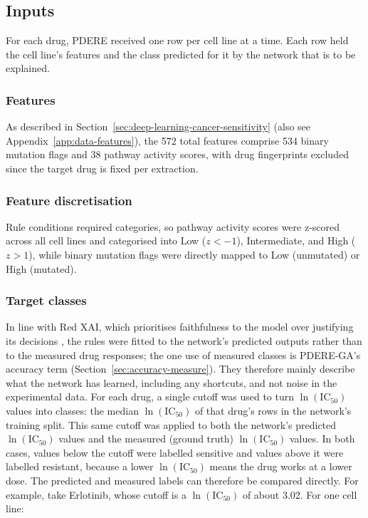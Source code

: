 \subsection{Inputs}
\label{sec:inputs}

For each drug, PDERE received one row per cell line at a time. Each row held the cell line's features and the class predicted for it by the network that is to be explained.

\subsubsection{Features}
\label{sec:features}

As described in Section~\ref{sec:deep-learning-cancer-sensitivity} (also see Appendix~\ref{app:data-features}), the 572 total features comprise 534 binary mutation flags and 38 pathway activity scores, with drug fingerprints excluded since the target drug is fixed per extraction.

\subsubsection{Feature discretisation}
\label{sec:discretisation}

Rule conditions required categories, so pathway activity scores were z-scored across all cell lines and categorised into Low ($z < -1$), Intermediate, and High ($z > 1$), while binary mutation flags were directly mapped to Low (unmutated) or High (mutated).

\subsubsection{Target classes}
\label{sec:target-classes}

In line with Red XAI, which prioritises faithfulness to the model over justifying its decisions \citep{biecek2024}, the rules were fitted to the network's predicted outputs rather than to the measured drug responses; the one use of measured classes is PDERE-GA's accuracy term (Section~\ref{sec:accuracy-measure}). They therefore mainly describe what the network has learned, including any shortcuts, and not noise in the experimental data. For each drug, a single cutoff was used to turn $\ln(\mathrm{IC}_{50})$ values into classes: the median $\ln(\mathrm{IC}_{50})$ of that drug's rows in the network's training split. This same cutoff was applied to both the network's predicted $\ln(\mathrm{IC}_{50})$ values and the measured (ground truth) $\ln(\mathrm{IC}_{50})$ values. In both cases, values below the cutoff were labelled sensitive and values above it were labelled resistant, because a lower $\ln(\mathrm{IC}_{50})$ means the drug works at a lower dose. The predicted and measured labels can therefore be compared directly. For example, take Erlotinib, whose cutoff is a $\ln(\mathrm{IC}_{50})$ of about 3.02. For one cell line:

